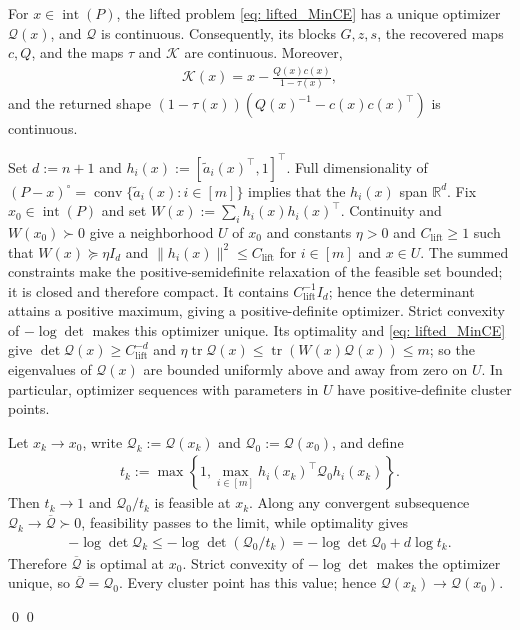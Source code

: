 \documentclass[smallextended]{svjour3}
\let\springerproof\proof
\let\endspringerproof\endproof
\renewenvironment{proof}{\springerproof}{%
  \ifhmode\qed\else\leavevmode\qed\fi\endspringerproof}
\newcommand{\R}{\mathbb{R}}
\newcommand{\K}{\mathcal{K}}
\begin{document}
\begin{lemma}\label{lemma: lifted_MinCE_continuity}
For $x\in\operatorname{int}(P)$, the lifted problem
\eqref{eq: lifted_MinCE} has a unique optimizer $\mathcal Q(x)$, and
$\mathcal Q$ is continuous. Consequently, its blocks $G,z,s$, the recovered
maps $c,Q$, and the maps $\tau$ and $\K$ are continuous. Moreover,
\begin{align}\label{eq: self_contained_K_formula}
    \K(x)=x-\frac{Q(x)c(x)}{1-\tau(x)},
\end{align}
and the returned shape
$(1-\tau(x))(Q(x)^{-1}-c(x)c(x)^\top)$ is continuous.
\end{lemma}
\begin{proof}
Set $d:=n+1$ and
$h_i(x):=[\tilde a_i(x)^\top,1]^\top$. Full dimensionality of
$(P-x)^\circ=\operatorname{conv}\{\tilde a_i(x):i\in[m]\}$ implies that the
$h_i(x)$ span $\R^d$. Fix $x_0\in\operatorname{int}(P)$ and set
$W(x):=\sum_i h_i(x)h_i(x)^\top$. Continuity and $W(x_0)\succ0$ give a
neighborhood $U$ of $x_0$ and constants $\eta>0$ and $C_{\mathrm{lift}}\geq1$ such that
$W(x)\succeq\eta I_d$ and $\|h_i(x)\|^2\leq C_{\mathrm{lift}}$ for $i\in[m]$ and $x\in U$.
The summed constraints make the positive-semidefinite relaxation of the feasible
set bounded; it is closed and therefore compact. It contains $C_{\mathrm{lift}}^{-1}I_d$; hence the determinant attains a positive
maximum, giving a positive-definite optimizer.
Strict convexity of $-\log\det$ makes this optimizer unique. Its optimality and \eqref{eq: lifted_MinCE} give
$\det\mathcal Q(x)\geq C_{\mathrm{lift}}^{-d}$ and $\eta\operatorname{tr}\mathcal Q(x) \leq\operatorname{tr}(W(x)\mathcal Q(x))\leq m$; 
so the eigenvalues of $\mathcal Q(x)$ are bounded uniformly above and away
from zero on $U$. In particular, optimizer sequences with parameters in $U$
have positive-definite cluster points.

Let $x_k\to x_0$, write $\mathcal Q_k:=\mathcal Q(x_k)$ and
$\mathcal Q_0:=\mathcal Q(x_0)$, and define
\begin{align*}
    t_k:=\max\left\{1,\max_{i\in[m]}
    h_i(x_k)^\top\mathcal Q_0h_i(x_k)\right\}.
\end{align*}
Then $t_k\to1$ and $\mathcal Q_0/t_k$ is feasible at $x_k$. Along any
convergent subsequence $\mathcal Q_k\to\overline{\mathcal Q}\succ0$,
feasibility passes to the limit, while optimality gives
\begin{align*}
    -\log\det\mathcal Q_k
    \leq-\log\det(\mathcal Q_0/t_k)
    =-\log\det\mathcal Q_0+d\log t_k.
\end{align*}
Therefore $\overline{\mathcal Q}$ is optimal at $x_0$. Strict convexity of
$-\log\det$ makes the optimizer unique, so
$\overline{\mathcal Q}=\mathcal Q_0$. Every cluster point has this value;
hence $\mathcal Q(x_k)\to\mathcal Q(x_0)$.


\end{proof}
\end{document}
